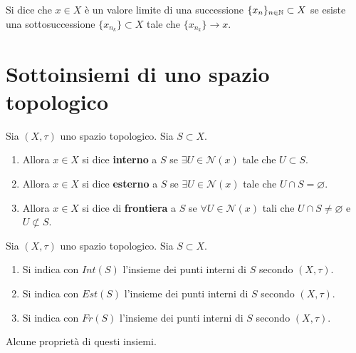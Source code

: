 \begin{definition}
	Si dice che $x \in X$ è un valore limite di una successione $\{x_n\}_{n\in \mathbb{N}} \subset X$ se esiste una sottosuccessione $\{x_{n_k}\} \subset X$ tale che $\{x_{n_k}\} \rightarrow x$.
\end{definition}

\section{Sottoinsiemi di uno spazio topologico}

\begin{definition}
	Sia $(X, \tau)$ uno spazio topologico. Sia $S \subset X$. 
	\begin{enumerate}
		\item Allora $x \in X$ si dice \textbf{interno} a $S$ se $\exists U \in \mathcal{N}(x)$ tale che $U \subset S$.
		\item Allora $x \in X$ si dice \textbf{esterno} a $S$ se $\exists U \in \mathcal{N}(x)$ tale che $U \cap S = \varnothing$.
		\item Allora $x \in X$ si dice di \textbf{frontiera} a $S$ se $\forall U \in \mathcal{N}(x)$ tali che $U \cap S \neq \varnothing$ e $U \not\subset S$.
	\end{enumerate}
\end{definition}

\begin{definition}
	Sia $(X, \tau)$ uno spazio topologico. Sia $S \subset X$. 
	\begin{enumerate}
		\item Si indica con $Int(S)$ l'insieme dei punti interni di $S$ secondo $(X,\tau)$.
		\item Si indica con $Est(S)$ l'insieme dei punti interni di $S$ secondo $(X,\tau)$.
		\item Si indica con $Fr(S)$ l'insieme dei punti interni di $S$ secondo $(X,\tau)$.
	\end{enumerate}
\end{definition}	

Alcune proprietà di questi insiemi.

